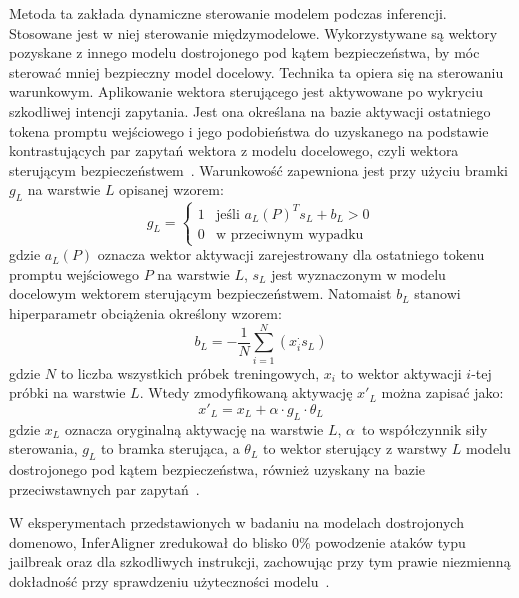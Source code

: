 Metoda ta zakłada dynamiczne sterowanie modelem podczas inferencji.
Stosowane jest w niej sterowanie międzymodelowe. Wykorzystywane są wektory pozyskane z innego modelu dostrojonego pod kątem bezpieczeństwa, by móc sterować mniej bezpieczny model docelowy.
Technika ta opiera się na sterowaniu warunkowym. Aplikowanie wektora sterującego jest aktywowane po wykryciu szkodliwej intencji zapytania. Jest ona określana na bazie aktywacji ostatniego tokena promptu wejściowego i jego podobieństwa do uzyskanego na podstawie kontrastujących par zapytań wektora z modelu docelowego, czyli wektora sterującym bezpieczeństwem~\cite{wang2024inferalignerinferencetimealignmentharmlessness}.
Warunkowość zapewniona jest przy użyciu bramki $g_L$ na warstwie $L$ opisanej wzorem:
\begin{equation}
    g_L = \begin{cases}
        1 & \text{jeśli } a_L(P)^T s_L + b_L > 0 \\
        0 & \text{w przeciwnym wypadku}
    \end{cases}
    \label{eq:gate}
\end{equation}
gdzie $a_L(P)$ oznacza wektor aktywacji zarejestrowany dla ostatniego tokenu promptu wejściowego $P$ na warstwie $L$, $s_L$ jest wyznaczonym w modelu docelowym wektorem sterującym bezpieczeństwem. Natomaist $b_L$ stanowi hiperparametr obciążenia określony wzorem:
\begin{equation}
    b_L = - \frac{1}{N} \sum_{i=1}^{N} (x_i^ \cdot s_L)
    \label{eq:bias_eq}
\end{equation}
gdzie $N$ to liczba wszystkich próbek treningowych, $x_i$ to wektor aktywacji $i$-tej próbki na warstwie $L$.
Wtedy zmodyfikowaną aktywację $x'_L$ można zapisać jako:
\begin{equation}
    x'_L = x_L + \alpha \cdot g_L \cdot \theta_L
\end{equation}
gdzie $x_L$ oznacza oryginalną aktywację na warstwie $L$, $\alpha$~to współczynnik siły sterowania, $g_L$ to bramka sterująca, a $\theta_L$ to wektor sterujący z warstwy $L$ modelu dostrojonego pod kątem bezpieczeństwa, również uzyskany na bazie przeciwstawnych par zapytań~\cite{wang2024inferalignerinferencetimealignmentharmlessness}.

W eksperymentach przedstawionych w badaniu na modelach dostrojonych domenowo, InferAligner zredukował do blisko 0\% powodzenie ataków typu jailbreak oraz dla szkodliwych instrukcji, zachowując przy tym prawie niezmienną dokładność przy sprawdzeniu użyteczności modelu~\cite{wang2024inferalignerinferencetimealignmentharmlessness}.

